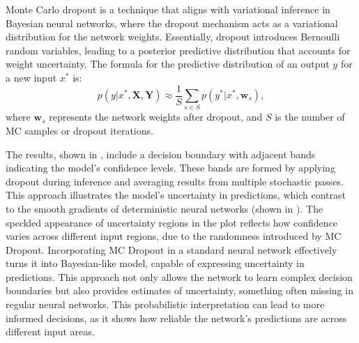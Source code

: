 Monte Carlo dropout is a technique that aligns with variational inference in Bayesian neural networks, where the dropout mechanism acts as a variational distribution for the network weights. Essentially, dropout introduces Bernoulli random variables, leading to a posterior predictive distribution that accounts for weight uncertainty. The formula for the predictive distribution of an output $ y $ for a new input $ x^* $ is: \[ p(y | x^*, \mathbf{X}, \mathbf{Y}) \approx \frac{1}{S} \sum_{s \in S} p(y^* | x^*, \mathbf{w}_s), \] where $ \mathbf{w}_s $ represents the network weights after dropout, and $ S $ is the number of MC samples or dropout iterations.

The results, shown in , include a decision boundary with adjacent bands indicating the model's confidence levels. These bands are formed by applying dropout during inference and averaging results from multiple stochastic passes. This approach illustrates the model's uncertainty in predictions, which contrast to the smooth gradients of deterministic neural networks (shown in ). The speckled appearance of uncertainty regions in the plot reflects how confidence varies across different input regions, due to the randomness introduced by MC Dropout. Incorporating MC Dropout in a standard neural network effectively turns it into Bayesian-like model, capable of expressing uncertainty in predictions. This approach not only allows the network to learn complex decision boundaries but also provides estimates of uncertainty, something often missing in regular neural networks. This probabilistic interpretation can lead to more informed decisions, as it shows how reliable the network's predictions are across different input areas.

